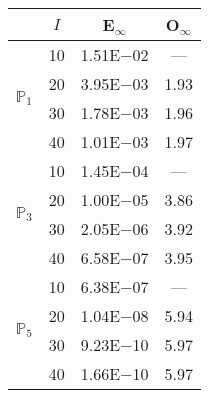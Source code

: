 \begin{table}[H]
\centering
\begin{tabular}{@{}l c c c@{}}
\toprule
 & $I$ & E$_{\infty}$ & O$_{\infty}$\\
\midrule
\multirow{4}{*}{$\mathbb{P}_{1}$}
 & 10 & 1.51E$-$02 & ---\\
 & 20 & 3.95E$-$03 & 1.93  \\
 & 30 & 1.78E$-$03 & 1.96  \\
 & 40 & 1.01E$-$03 & 1.97  \\
\midrule
\multirow{4}{*}{$\mathbb{P}_{3}$}
 & 10 & 1.45E$-$04 & ---\\
 & 20 & 1.00E$-$05 & 3.86  \\
 & 30 & 2.05E$-$06 & 3.92  \\
 & 40 & 6.58E$-$07 & 3.95  \\
\midrule
\multirow{4}{*}{$\mathbb{P}_{5}$}
 & 10 & 6.38E$-$07 & ---\\
 & 20 & 1.04E$-$08 & 5.94  \\
 & 30 & 9.23E$-$10 & 5.97  \\
 & 40 & 1.66E$-$10 & 5.97  \\
\bottomrule
\end{tabular}
\end{table}
